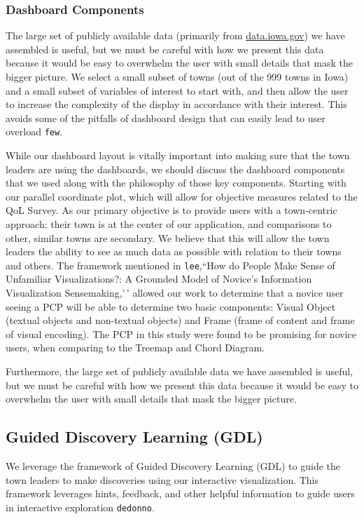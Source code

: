 \documentclass[letterpaper,inpress]{jdsart}
\begin{document}
\subsubsection{Dashboard Components}

The large set of publicly available data (primarily from \url{data.iowa.gov}) we have assembled is useful, but we must be careful with how we present this data because it would be easy to overwhelm the user with small details that mask the bigger picture. We select a small subset of towns (out of the 999 towns in Iowa) and a small subset of variables of interest to start with, and then allow the user to increase the complexity of the display in accordance with their interest. This avoids some of the pitfalls of dashboard design that can easily lead to user overload \texttt{few}.

While our dashboard layout is vitally important into making sure that the town leaders are using the dashboards, we should discuss the dashboard components that we used along with the philosophy of those key components. Starting with our parallel coordinate plot, which will allow for objective measures related to the QoL Survey. As our primary objective is to provide users with a town-centric approach: their town is at the center of our application, and comparisons to other, similar towns are secondary. We believe that this will allow the town leaders the ability to see as much data as possible with relation to their towns and others. The framework mentioned in \texttt{lee},``How do People Make Sense of Unfamiliar Visualizations?: A Grounded Model of Novice's Information Visualization Sensemaking,'\,' allowed our work to determine that a novice user seeing a PCP will be able to determine two basic components: Visual Object (textual objects and non-textual objects) and Frame (frame of content and frame of visual encoding). The PCP in this study were found to be promising for novice users, when comparing to the Treemap and Chord Diagram.

Furthermore, the large set of publicly available data we have assembled is useful, but we must be careful with how we present this data because it would be easy to overwhelm the user with small details that mask the bigger picture.

\subsection{Guided Discovery Learning (GDL)}

We leverage the framework of Guided Discovery Learning (GDL) to guide the town leaders to make discoveries using our interactive visualization. This framework leverages hints, feedback, and other helpful information to guide users in interactive exploration \texttt{dedonno}.
\end{document}
